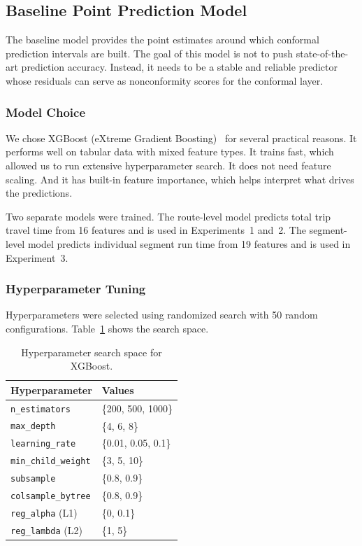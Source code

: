 \documentclass[12pt, a4paper, oneside]{report}
\begin{document}
\subsection{Baseline Point Prediction Model}
\label{subsec:baseline_model}

The baseline model provides the point estimates around which conformal prediction intervals are built. The goal of this model is not to push state-of-the-art prediction accuracy. Instead, it needs to be a stable and reliable predictor whose residuals can serve as nonconformity scores for the conformal layer.

\subsubsection{Model Choice}

We chose XGBoost (eXtreme Gradient Boosting)~\cite{chen2016xgboost} for several practical reasons. It performs well on tabular data with mixed feature types. It trains fast, which allowed us to run extensive hyperparameter search. It does not need feature scaling. And it has built-in feature importance, which helps interpret what drives the predictions.

Two separate models were trained. The route-level model predicts total trip travel time from 16 features and is used in Experiments~1 and~2. The segment-level model predicts individual segment run time from 19 features and is used in Experiment~3.

\subsubsection{Hyperparameter Tuning}

Hyperparameters were selected using randomized search with 50 random configurations. Table~\ref{tab:hyperparam_search} shows the search space.

\begin{table}[H]
\centering
\caption{Hyperparameter search space for XGBoost.}
\label{tab:hyperparam_search}
\begin{tabular}{ll}
\toprule
\textbf{Hyperparameter} & \textbf{Values} \\
\midrule
\texttt{n\_estimators} & \{200, 500, 1000\} \\
\texttt{max\_depth} & \{4, 6, 8\} \\
\texttt{learning\_rate} & \{0.01, 0.05, 0.1\} \\
\texttt{min\_child\_weight} & \{3, 5, 10\} \\
\texttt{subsample} & \{0.8, 0.9\} \\
\texttt{colsample\_bytree} & \{0.8, 0.9\} \\
\texttt{reg\_alpha} (L1) & \{0, 0.1\} \\
\texttt{reg\_lambda} (L2) & \{1, 5\} \\
\bottomrule
\end{tabular}
\end{table}
\end{document}
